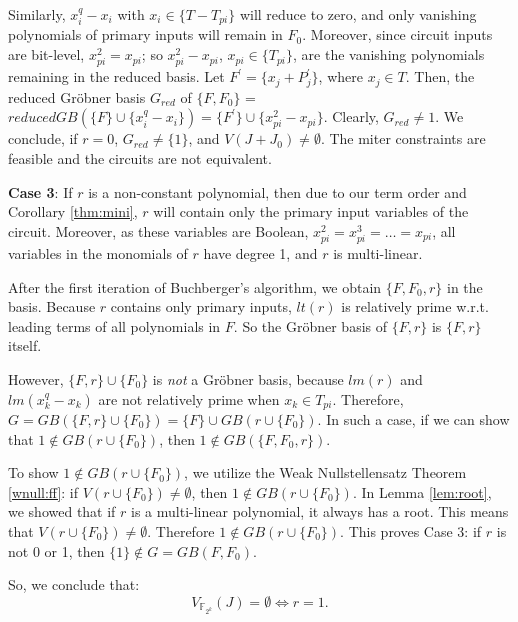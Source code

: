 \begin{Proof}
Similarly, $x_i^{q}-x_i$ with $x_i\in \{T-T_{pi}\}$
will reduce to zero, and only vanishing polynomials of primary inputs
will remain in $F_0$. Moreover, since circuit inputs are bit-level,
$x_{pi}^2 = x_{pi}$; so $x_{pi}^{2}-x_{pi}$, $x_{pi}\in \{T_{pi}\}$,
are the vanishing polynomials remaining in the reduced basis. Let
$F^{'}=\{x_j+P_j^{'}\}$, where $x_j \in T$. Then, the reduced
Gr\"obner basis $G_{red}$ of $\{F, F_0\}$ = $reducedGB(\{F\} \cup
\{x_i^{q}-x_i\})=\{F^{'}\} \cup \{x_{pi}^{2}-x_{pi}\}$. Clearly,
$G_{red} \neq 1$. We conclude, if $r=0$, $G_{red} \neq \{1\}$, and
$V(J + J_0) \neq \emptyset$. The miter constraints are feasible and the
circuits are not equivalent. 


{\bf Case 3}: If $r$ is a non-constant polynomial, then due to our
term order and Corollary \ref{thm:mini}, $r$ will contain only the
primary input variables of the circuit. Moreover, as these variables
are Boolean, $x_{pi}^2 = x_{pi}^3 = \dots = x_{pi}$, all variables in
the monomials of $r$ have degree 1, and $r$ is multi-linear.





After the first iteration of Buchberger's algorithm, we obtain $\{F,
F_0, r\}$ in the basis. Because $r$ contains only primary inputs,
$lt(r)$ is relatively prime w.r.t. leading terms of all polynomials in
$F$. So the Gr\"obner basis of $\{F,r\}$ is $\{F,r\}$ itself.

However, $\{F,r\}\cup \{F_{0}\}$ is {\it not} a Gr\"obner basis,
because $lm(r)$ and $lm(x_k^{q}-x_k)$ are not relatively prime when
$x_k\in T_{pi}$.  Therefore, $G = GB(\{F,r\}\cup
\{F_{0}\}) = \{F\} \cup GB(r\cup \{F_{0}\})$. In such a
case, if we can show that $1 \notin GB(r\cup \{F_{0}\})$, then
$1\notin GB(\{F,F_{0},r\})$. 

To show $1 \notin GB(r\cup \{F_{0}\})$, we utilize the Weak
Nullstellensatz Theorem \ref{wnull:ff}: if $V(r\cup \{F_{0}\})\neq
\emptyset$,  then $1 \notin GB(r\cup \{F_{0}\})$. In Lemma
\ref{lem:root}, we showed that if $r$ is a multi-linear  
polynomial, it always has a root. This means that $V(r\cup
\{F_{0}\})\neq \emptyset$.  Therefore $1 \notin GB(r\cup
\{F_{0}\})$. This proves Case 3: if $r$ is not 0 or 1, then $\{1\}
\notin G = GB(F,F_0)$.  

So, we conclude that:
\begin{equation}
	V_{\mathbb{F}_{2^k}}(J)=\emptyset \iff r=1.
\end{equation}
\end{Proof}

